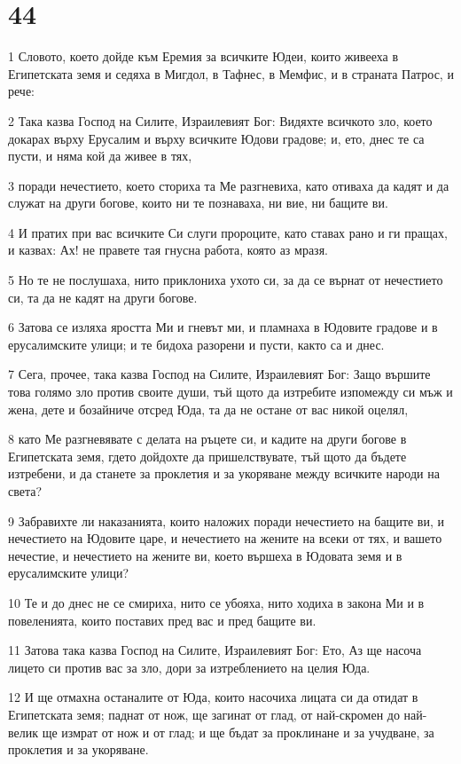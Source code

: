 \chapter{44}

\par 1 Словото, което дойде към Еремия за всичките Юдеи, които живееха в Египетската земя и седяха в Мигдол, в Тафнес, в Мемфис, и в страната Патрос, и рече:
\par 2 Така казва Господ на Силите, Израилевият Бог: Видяхте всичкото зло, което докарах върху Ерусалим и върху всичките Юдови градове; и, ето, днес те са пусти, и няма кой да живее в тях,
\par 3 поради нечестието, което сториха та Ме разгневиха, като отиваха да кадят и да служат на други богове, които ни те познаваха, ни вие, ни бащите ви.
\par 4 И пратих при вас всичките Си слуги пророците, като ставах рано и ги пращах, и казвах: Ах! не правете тая гнусна работа, която аз мразя.
\par 5 Но те не послушаха, нито приклониха ухото си, за да се върнат от нечестието си, та да не кадят на други богове.
\par 6 Затова се изляха яростта Ми и гневът ми, и пламнаха в Юдовите градове и в ерусалимските улици; и те бидоха разорени и пусти, както са и днес.
\par 7 Сега, прочее, така казва Господ на Силите, Израилевият Бог: Защо вършите това голямо зло против своите души, тъй щото да изтребите изпомежду си мъж и жена, дете и бозайниче отсред Юда, та да не остане от вас никой оцелял,
\par 8 като Ме разгневявате с делата на ръцете си, и кадите на други богове в Египетската земя, гдето дойдохте да пришелствувате, тъй щото да бъдете изтребени, и да станете за проклетия и за укоряване между всичките народи на света?
\par 9 Забравихте ли наказанията, които наложих поради нечестието на бащите ви, и нечестието на Юдовите царе, и нечестието на жените на всеки от тях, и вашето нечестие, и нечестието на жените ви, което вършеха в Юдовата земя и в ерусалимските улици?
\par 10 Те и до днес не се смириха, нито се убояха, нито ходиха в закона Ми и в повеленията, които поставих пред вас и пред бащите ви.
\par 11 Затова така казва Господ на Силите, Израилевият Бог: Ето, Аз ще насоча лицето си против вас за зло, дори за изтреблението на целия Юда.
\par 12 И ще отмахна останалите от Юда, които насочиха лицата си да отидат в Египетската земя; паднат от нож, ще загинат от глад, от най-скромен до най-велик ще измрат от нож и от глад; и ще бъдат за проклинане и за учудване, за проклетия и за укоряване.

